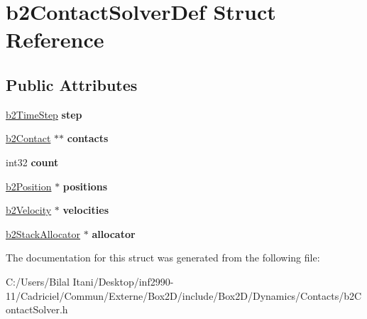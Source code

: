 \hypertarget{structb2_contact_solver_def}{}\section{b2\+Contact\+Solver\+Def Struct Reference}
\label{structb2_contact_solver_def}
\subsection*{Public Attributes}
\begin{DoxyCompactItemize}
\item 
\hyperlink{structb2_time_step}{b2\+Time\+Step} {\bfseries step}\hypertarget{structb2_contact_solver_def_a544604c01e6606ab54b8ccd5289a7ac7}{}\label{structb2_contact_solver_def_a544604c01e6606ab54b8ccd5289a7ac7}

\item 
\hyperlink{classb2_contact}{b2\+Contact} $\ast$$\ast$ {\bfseries contacts}\hypertarget{structb2_contact_solver_def_a4b9d708e3122cab8d9dabeafefc7a9af}{}\label{structb2_contact_solver_def_a4b9d708e3122cab8d9dabeafefc7a9af}

\item 
int32 {\bfseries count}\hypertarget{structb2_contact_solver_def_ae977ea1cee4b7b9ee99210d9b66f88ea}{}\label{structb2_contact_solver_def_ae977ea1cee4b7b9ee99210d9b66f88ea}

\item 
\hyperlink{structb2_position}{b2\+Position} $\ast$ {\bfseries positions}\hypertarget{structb2_contact_solver_def_aaf1432d040aa6279d91d8c9f24a4728a}{}\label{structb2_contact_solver_def_aaf1432d040aa6279d91d8c9f24a4728a}

\item 
\hyperlink{structb2_velocity}{b2\+Velocity} $\ast$ {\bfseries velocities}\hypertarget{structb2_contact_solver_def_ae839e5c5464aa54c1ad8ce1634b49a1f}{}\label{structb2_contact_solver_def_ae839e5c5464aa54c1ad8ce1634b49a1f}

\item 
\hyperlink{classb2_stack_allocator}{b2\+Stack\+Allocator} $\ast$ {\bfseries allocator}\hypertarget{structb2_contact_solver_def_a54198ac9886a988b9ffd06cf28c4c45c}{}\label{structb2_contact_solver_def_a54198ac9886a988b9ffd06cf28c4c45c}

\end{DoxyCompactItemize}


The documentation for this struct was generated from the following file\+:\begin{DoxyCompactItemize}
\item 
C\+:/\+Users/\+Bilal Itani/\+Desktop/inf2990-\/11/\+Cadriciel/\+Commun/\+Externe/\+Box2\+D/include/\+Box2\+D/\+Dynamics/\+Contacts/b2\+Contact\+Solver.\+h\end{DoxyCompactItemize}
